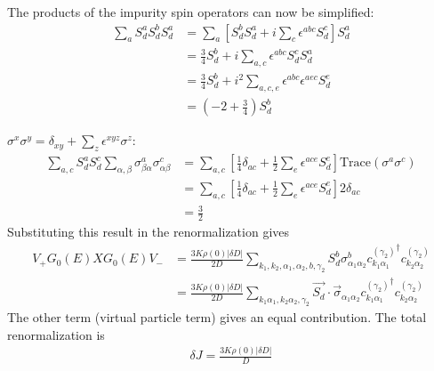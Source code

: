 \documentclass[twoside,11pt]{report}
\numberwithin{equation}{section}
\begin{document}
The products of the impurity spin operators can now be simplified:
\begin{equation}\begin{aligned}
	\sum_a S_d^a S_d^b S_d^a &= \sum_a \left[S_d^b S_d^a + i\sum_c \epsilon^{abc}S_d^c\right] S_d^a\\
				 &= \frac{3}{4}S_d^b + i\sum_{a,c}  \epsilon^{abc}S_d^c S_d^a\\
				 &= \frac{3}{4}S_d^b + i^2\sum_{a,c,e}  \epsilon^{abc}  \epsilon^{aec}S_d^e\\
				 &= \left(-2 + \frac{3}{4}\right)S_d^b
\end{aligned}\end{equation}

\(\sigma^x \sigma^y = \delta_{xy} + \sum_z \epsilon^{xyz}\sigma^z\):
\begin{equation}\begin{aligned}
	\sum_{a,c} S_d^aS_d^c\sum_{\alpha,\beta}\sigma^a_{\beta \alpha}\sigma^c_{\alpha \beta} &= \sum_{a,c} \left[\frac{1}{4}\delta_{ac} + \frac{1}{2}\sum_e \epsilon^{ace}S_d^e\right] \mathrm{Trace}\left(\sigma^a \sigma^c\right)\\
											       &= \sum_{a,c} \left[\frac{1}{4}\delta_{ac} + \frac{1}{2}\sum_e \epsilon^{ace}S_d^e\right] 2\delta_{ac}\\
											       &= \frac{3}{2}
\end{aligned}\end{equation}
Substituting this result in the renormalization gives
\begin{equation}\begin{aligned}
	V_+G_0(E)XG_0(E)V_- &= \frac{3K\rho(0) |\delta D|}{2D} \sum_{k_1,k_2,\alpha_1,\alpha_2,b,\gamma_2}S_d^b\sigma^b_{\alpha_1 \alpha_2}{c^{(\gamma_2)}_{k_1 \alpha_1}}^\dagger c^{(\gamma_2)}_{k_2 \alpha_2}\\
			    &= \frac{3K\rho(0) |\delta D|}{2D} \sum_{k_1\alpha_1,k_2 \alpha_2,\gamma_2}\vec{S_d}\cdot\vec{\sigma}_{\alpha_1\alpha_2}{c^{(\gamma_2)}_{k_1 \alpha_1}}^\dagger c^{(\gamma_2)}_{k_2 \alpha_2}
\end{aligned}\end{equation}
The other term (virtual particle term) gives an equal contribution. The total renormalization is
\begin{equation}\begin{aligned}
	\delta J = \frac{3K\rho(0) |\delta D|}{D}
\end{aligned}\end{equation}
\end{document}
